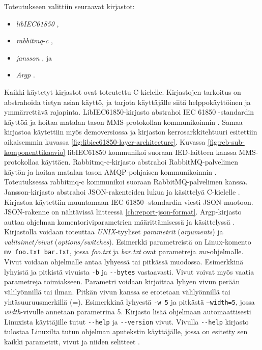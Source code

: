 Toteutukseen valittiin seuraavat kirjastot:
\begin{itemize}
	\item \emph{libIEC61850} \cite{libIEC61850-repo},
	\item \emph{rabbitmq-c} \cite{rabbitmq-c-repo},
	\item \emph{jansson} \cite{jansson-repo}, ja
	\item \emph{Argp} \cite{argp-glibc-guide}.
\end{itemize}
Kaikki käytetyt kirjastot ovat toteutettu C-kielelle. Kirjastojen tarkoitus on abstrahoida tietyn asian käyttö, ja tarjota käyttäjälle siitä helppokäyttöinen ja ymmärrettävä rajapinta. LibIEC61850-kirjasto abstrahoi IEC 61850 -standardin käyttöä ja hoitaa matalan tason MMS-protokollan kommunikoinnin \cite{libIEC61850-repo}. Samaa kirjastoa käytettiin myös demoversiossa ja kirjaston kerrosarkkitehtuuri esitettiin aikaisemmin kuvassa \ref{fig:libiec61850-layer-architecture}. Kuvassa \ref{fig:rcb-sub-komponenttikaavio} libIEC61850 kommunikoi suoraan IED-laitteen kanssa MMS-protokollaa käyttäen. Rabbitmq-c-kirjasto abstrahoi RabbitMQ-palvelimen käytön ja hoitaa matalan tason AMQP-pohjaisen kommunikoinnin \cite{rabbitmq-c-repo}. Toteutuksessa rabbitmq-c kommunikoi suoraan RabbitMQ-palvelimen kanssa. Jansson-kirjasto abstrahoi JSON-rakenteiden lukua ja käsittelyä C-kielelle \cite{jansson-repo}. Kirjastoa käytettiin muuntamaan IEC 61850 -standardin viesti JSON-muotoon. JSON-rakenne on nähtävissä liitteessä \ref{ch:report-json-format}. Argp-kirjasto auttaa ohjelman komentoriviparametrien määrittämisessä ja käsittelyssä \cite{argp-glibc-guide}. Kirjastolla voidaan toteuttaa \emph{UNIX}-tyyliset \emph{parametrit} (\emph{arguments}) ja \emph{valitsimet/vivut} (\emph{options/switches}). Esimerkki parametreistä on Linux-komento \texttt{mv foo.txt bar.txt}, jossa \emph{foo.txt} ja \emph{bar.txt} ovat parametreja \emph{mv}-ohjelmalle. Vivut voidaan ohjelmalle antaa lyhyessä tai pitkässä muodossa. Esimerkkinä lyhyistä ja pitkistä vivuista \texttt{-b} ja \texttt{-{}-bytes} vastaavasti. Vivut voivat myös vaatia parametreja toimiakseen. Parametri voidaan kirjoittaa lyhyen vivun perään välilyönnillä tai ilman. Pitkän vivun kanssa se erotetaan välilyönnillä tai yhtäsuuruusmerkillä (=). Esimerkkinä lyhyestä \texttt{-w 5} ja pitkästä \texttt{--width=5}, jossa \emph{width}-vivulle annetaan parametrina 5. Kirjasto lisää ohjelmaan automaattisesti Linuxista käyttäjille tutut \texttt{-{}-help} ja \texttt{-{}-version} vivut. Vivulla \texttt{-{}-help} kirjasto tulostaa Linuxilta tutun ohjelman aputekstin käyttäjälle, jossa on esitetty sen kaikki parametrit, vivut ja niiden selitteet \cite{step-by-step-into-argp}.

